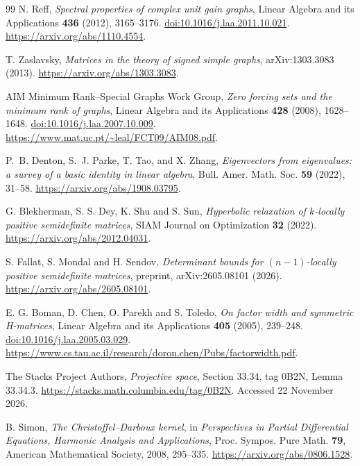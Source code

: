 \documentclass[11pt,a4paper,oneside]{report}
\theoremstyle{definition}
\theoremstyle{remark}
\begin{document}
\begin{thebibliography}{99}
N. Reff,
\emph{Spectral properties of complex unit gain graphs},
Linear Algebra and its Applications \textbf{436} (2012), 3165--3176.
\href{https://doi.org/10.1016/j.laa.2011.10.021}{doi:10.1016/j.laa.2011.10.021}.
\url{https://arxiv.org/abs/1110.4554}.

T. Zaslavsky,
\emph{Matrices in the theory of signed simple graphs},
arXiv:1303.3083 (2013).
\url{https://arxiv.org/abs/1303.3083}.

AIM Minimum Rank--Special Graphs Work Group,
\emph{Zero forcing sets and the minimum rank of graphs},
Linear Algebra and its Applications \textbf{428} (2008), 1628--1648.
\href{https://doi.org/10.1016/j.laa.2007.10.009}{doi:10.1016/j.laa.2007.10.009}.
\url{https://www.mat.uc.pt/~leal/FCT09/AIM08.pdf}.

P.~B. Denton, S.~J. Parke, T. Tao, and X. Zhang,
\emph{Eigenvectors from eigenvalues: a survey of a basic identity
in linear algebra}, Bull. Amer. Math. Soc. \textbf{59} (2022), 31--58.
\url{https://arxiv.org/abs/1908.03795}.

G. Blekherman, S. S. Dey, K. Shu and S. Sun,
\emph{Hyperbolic relaxation of \(k\)-locally positive semidefinite matrices},
SIAM Journal on Optimization \textbf{32} (2022).
\url{https://arxiv.org/abs/2012.04031}.

S. Fallat, S. Mondal and H. Sendov,
\emph{Determinant bounds for \((n-1)\)-locally positive semidefinite matrices},
preprint, arXiv:2605.08101 (2026).
\url{https://arxiv.org/abs/2605.08101}.

E. G. Boman, D. Chen, O. Parekh and S. Toledo,
\emph{On factor width and symmetric H-matrices},
Linear Algebra and its Applications \textbf{405} (2005), 239--248.
\href{https://doi.org/10.1016/j.laa.2005.03.029}{doi:10.1016/j.laa.2005.03.029}.
\url{https://www.cs.tau.ac.il/research/doron.chen/Pubs/factorwidth.pdf}.

The Stacks Project Authors, \emph{Projective space},
Section 33.34, tag 0B2N, Lemma 33.34.3.
\url{https://stacks.math.columbia.edu/tag/0B2N}.
Accessed 22 November 2026.

B. Simon, \emph{The Christoffel--Darboux kernel}, in \emph{Perspectives in Partial Differential Equations, Harmonic Analysis and Applications}, Proc. Sympos. Pure Math. \textbf{79}, American Mathematical Society, 2008, 295--335. \url{https://arxiv.org/abs/0806.1528}.


\end{thebibliography}
\end{document}
